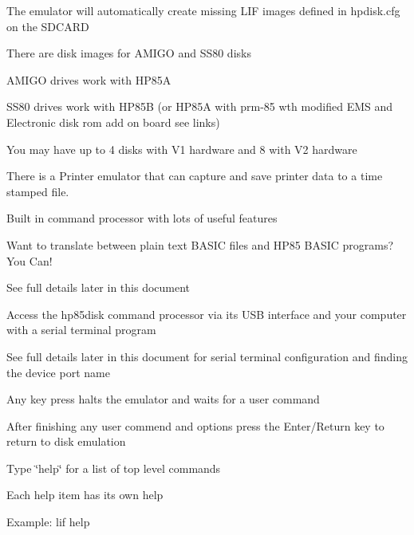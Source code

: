 The emulator will automatically create missing L\+IF images defined in hpdisk.\+cfg on the S\+D\+C\+A\+RD
\begin{DoxyItemize}
\item There are disk images for A\+M\+I\+GO and S\+S80 disks
\begin{DoxyItemize}
\item A\+M\+I\+GO drives work with H\+P85A
\item S\+S80 drives work with H\+P85B (or H\+P85A with prm-\/85 wth modified E\+MS and Electronic disk rom add on board see links)
\begin{DoxyItemize}
\item You may have up to 4 disks with V1 hardware and 8 with V2 hardware
\end{DoxyItemize}
\end{DoxyItemize}
\item There is a Printer emulator that can capture and save printer data to a time stamped file.
\item Built in command processor with lots of useful features
\begin{DoxyItemize}
\item Want to translate between plain text B\+A\+S\+IC files and H\+P85 B\+A\+S\+IC programs? You Can!
\begin{DoxyItemize}
\item See full details later in this document
\end{DoxyItemize}
\item Access the hp85disk command processor via its U\+SB interface and your computer with a serial terminal program
\begin{DoxyItemize}
\item See full details later in this document for serial terminal configuration and finding the device port name
\end{DoxyItemize}
\item Any key press halts the emulator and waits for a user command
\begin{DoxyItemize}
\item After finishing any user commend and options press the Enter/\+Return key to return to disk emulation
\end{DoxyItemize}
\item Type \char`\"{}help\char`\"{} for a list of top level commands
\begin{DoxyItemize}
\item Each help item has its own help
\item Example\+: lif help
\end{DoxyItemize}
\end{DoxyItemize}
\end{DoxyItemize}

